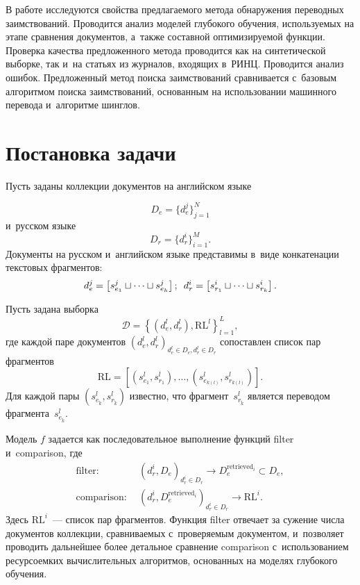 \begin{multicols}{2}
В работе исследуются свойства предлагаемого метода обнаружения переводных 
заимствований. Проводится анализ моделей глубокого обучения, используемых на 
этапе сравнения документов, а~также составной оптимизируемой функции. Проверка 
качества предложенного метода проводится как на синтетической выборке, так и~на 
статьях из журналов, входящих в~РИНЦ. 
Проводится анализ ошибок. Предложенный метод поиска заимствований сравнивается 
с~базовым алгоритмом поиска заимствований, основанным на использовании машинного 
перевода и~алгоритме шинглов.

\vspace*{-6pt}

\section{Постановка задачи}

Пусть заданы коллекции документов на английском языке 

\noindent
$$
D_e = \{d_e^j\}_{j=1}^N
$$ 
и~русском языке 
$$
D_r = \{d_r^i\}_{i=1}^M.
$$
 Документы на русском и~английском 
языке представимы в~виде конкатенации текстовых фрагментов:
$$
d_e^j = \left[s_{e_1}^j \sqcup \cdots \sqcup s_{e_h}^j\right];\enskip
d_r^i \hm= \left[s_{r_1}^i 
\sqcup \cdots \sqcup s_{r_k}^i\right].
$$

Пусть задана выборка  
$$
\mathcal{D}=\left\{(d_e^l, d_r^l), \mathrm{RL}^l\right\}_{l=1}^L,
$$
 где каждой 
паре документов $(d_e^l, d_r^l)_{d_e^l \in D_e, d_r^l \in D_r}$ сопоставлен 
список пар фрагментов 
$$
\mathrm{RL}= \left[(s_{e_1}^l, s_{r_1}^l), \ldots, (s_{e_{k(l)}}^l, 
s_{r_{k(l)}}^l)\right].
$$
 Для каждой пары $(s_{e_{\tilde{k}}}^l, s_{r_{\tilde{k}}}^l)$ 
известно, что фрагмент~$s_{r_{\tilde{k}}}^l$ является переводом фрагмента~$s_{e_{\tilde{k}}}^l$.


Модель $f$ задается как последовательное выполнение функций {filter} 
и~comparison, где
\begin{align*}
\mbox{filter:}&\ \ (d_r^i, D_e)_{d_r^i \in D_r} \rightarrow D_e^{\mathrm{retrieved}_i} \subset 
D_e,\\
\mbox{comparison:}&\ \  (d_r^i, D_e^{\mathrm{retrieved}_i})_{d_r^i \in D_r} \rightarrow \mathrm{RL}^{i}.
\end{align*}
Здесь $\mathrm{RL}^{i}$~--- список пар фрагментов. Функция {filter} отвечает за 
сужение числа документов коллекции, сравниваемых с~проверяемым документом, 
и~позволяет проводить дальнейшее более детальное сравнение {comparison} 
с~использованием ресурсоемких вычислительных алгоритмов, основанных на моделях 
глубокого обучения.



\end{multicols}
